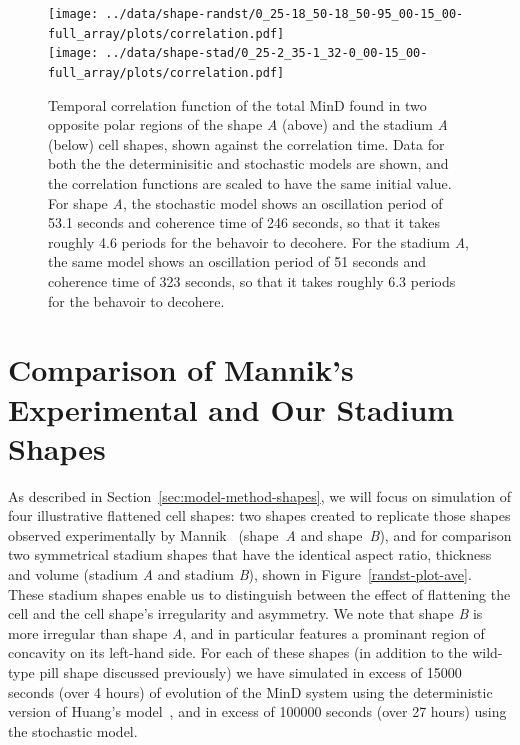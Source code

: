 \documentclass{pnastwo}
\begin{document}
\begin{article}
\begin{figure}
  \begin{center}
    \texttt{[image: ../data/shape-randst/0\_25-18\_50-18\_50-95\_00-15\_00-full\_array/plots/correlation.pdf]}\\
    \texttt{[image: ../data/shape-stad/0\_25-2\_35-1\_32-0\_00-15\_00-full\_array/plots/correlation.pdf]}
  \end{center}
  \caption{Temporal correlation function of the total MinD found in
    two opposite polar regions of the shape \emph{A} (above) and the
    stadium \emph{A} (below) cell shapes, shown against the
    correlation time.  Data for both the the determinisitic and
    stochastic models are shown, and the correlation functions are
    scaled to have the same initial value.  For shape \emph{A}, the
    stochastic model shows an oscillation period of 53.1 seconds and
    coherence time of 246 seconds, so that it takes roughly 4.6 periods
    for the behavoir to decohere.  For the stadium \emph{A}, the same
    model shows an oscillation period of 51 seconds and coherence time of
    323 seconds, so that it takes roughly 6.3 periods for the behavoir
    to decohere.}
  \label{fig:corr-pancake-A}
\end{figure}

\section{Comparison of Mannik's Experimental and Our Stadium Shapes}
As described in Section~\ref{sec:model-method-shapes}, we will focus
on simulation of four illustrative flattened cell shapes: two shapes
created to replicate those shapes observed experimentally by
Mannik~\cite{mannik2012robustness} (shape~\emph{A} and
shape~\emph{B}), and for comparison two symmetrical stadium shapes
that have the identical aspect ratio, thickness and volume (stadium
\emph{A} and stadium \emph{B}), shown in Figure~\ref{randst-plot-ave}.
These stadium shapes enable us to distinguish between the effect of
flattening the cell and the cell shape's irregularity and asymmetry.
We note that shape \emph{B} is more irregular than shape \emph{A}, and
in particular features a prominant region of concavity on its
left-hand side.  For each of these shapes (in addition to the
wild-type pill shape discussed previously) we have simulated in excess
of 15000 seconds (over 4 hours) of evolution of the MinD system using
the deterministic version of Huang's model~\cite{huang2003dynamic},
and in excess of 100000 seconds (over 27 hours) using the stochastic
model.


\end{article}
\end{document}
